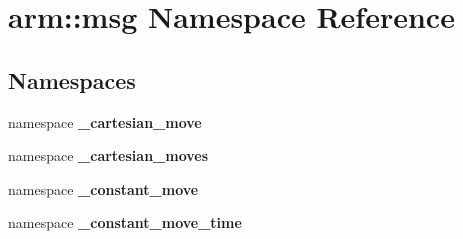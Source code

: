 \section{arm\-:\-:msg \-Namespace \-Reference}
\label{namespacearm_1_1msg}
\subsection*{\-Namespaces}
\begin{DoxyCompactItemize}
\item 
namespace {\bf \-\_\-cartesian\-\_\-move}
\item 
namespace {\bf \-\_\-cartesian\-\_\-moves}
\item 
namespace {\bf \-\_\-constant\-\_\-move}
\item 
namespace {\bf \-\_\-constant\-\_\-move\-\_\-time}
\end{DoxyCompactItemize}
